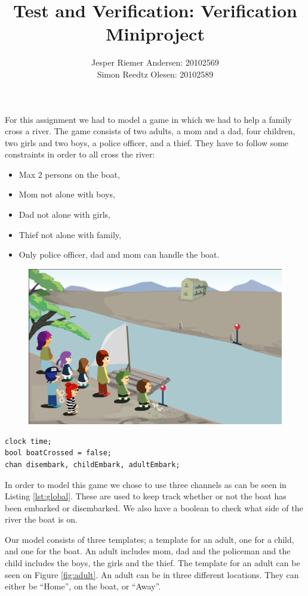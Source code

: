 \documentclass[a4paper,12pt]{article}
\title{Test and Verification: Verification Miniproject}
\author{Jesper Riemer Andersen: 20102569\\Simon Reedtz Olesen: 20102589}
\begin{document}
\maketitle

For this assignment we had to model a game in which we had to help a family cross a river. The game consists of two adults, a mom and a dad, four children, two girls and two boys, a police officer, and a thief. They have to follow some constraints in order to all cross the river:

\begin{itemize}[noitemsep]
\item Max 2 persons on the boat,
\item Mom not alone with boys,
\item Dad not alone with girls,
\item Thief not alone with family,
\item Only police officer, dad and mom can handle the boat.
\end{itemize}


\begin{figure}[H]
\centering
\includegraphics[width=0.8\linewidth]{Crossing_The_River.png}
\end{figure}

\newpage

\begin{lstlisting}[caption={Global variables},label={lst:global}]
clock time;
bool boatCrossed = false;
chan disembark, childEmbark, adultEmbark;
\end{lstlisting}

In order to model this game we chose to use three channels as can be seen in Listing \ref{lst:global}. These are used to keep track whether or not the boat has been embarked or disembarked. We also have a boolean to check what side of the river the boat is on.

Our model consists of three templates; a template for an adult, one for a child, and one for the boat. An adult includes mom, dad and the policeman and the child includes the boys, the girls and the thief. The template for an adult can be seen on Figure \ref{fig:adult}. An adult can be in three different locations. They can either be ``Home'', on the boat, or ``Away''. 
\end{document}
